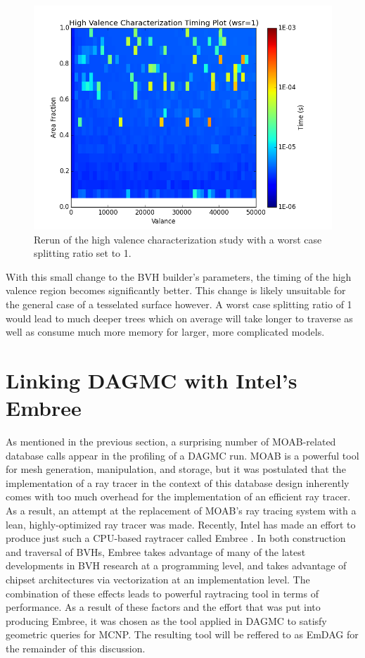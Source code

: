 \documentclass[12pt, a4paper]{article}
\begin{document}
  
\begin{figure}[H]
  \centering
    \includegraphics[scale=0.35]{hv_study_MOAB_wsr1.png}
    \caption{Rerun of the high valence characterization study with a worst case splitting ratio set to 1.}
\end{figure}


With this small change to the BVH builder's parameters, the timing of the high valence region becomes significantly better. This change is likely unsuitable for the general case of a tesselated surface however. A worst case splitting ratio of 1 would lead to much deeper trees which on average will take longer to traverse as well as consume much more memory for larger, more complicated models.

\section{Linking DAGMC with Intel's Embree}%
\label{emdag}

As mentioned in the previous section, a surprising number of MOAB-related database calls appear in the profiling of a DAGMC run. MOAB is a powerful tool for mesh generation, manipulation, and storage, but it was postulated that the implementation of a ray tracer in the context of this database design inherently comes with too much overhead for the implementation of an efficient ray tracer. As a result, an attempt at the replacement of MOAB's ray tracing system with a lean, highly-optimized ray tracer was made. Recently, Intel has made an effort to produce just such a CPU-based raytracer called Embree \cite{embree}. In both construction and traversal of BVHs, Embree takes advantage of many of the latest developments in BVH research at a programming level, and takes advantage of chipset architectures via vectorization at an implementation level. The combination of these effects leads to powerful raytracing tool in terms of performance. As a result of these factors and the effort that was put into producing Embree, it was chosen as the tool applied in DAGMC to satisfy geometric queries for MCNP. The resulting tool will be reffered to as EmDAG for the remainder of this discussion.
\end{document}
